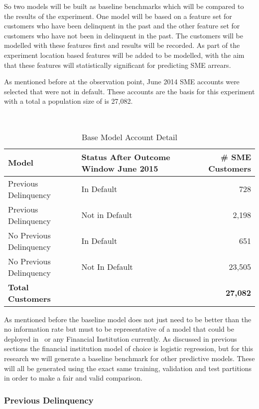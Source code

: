 So two models will be built as baseline benchmarks which will be compared to the results of the experiment. One model will be based on a feature set for customers who have been delinquent in the past and the other feature set for customers who have not been in delinquent in the past. The customers will be modelled with these features first and results will be recorded. As part of the experiment location based features will be added to be modelled, with the aim that these features will statistically significant for predicting SME arrears. 

As mentioned before at the observation point, June 2014 SME accounts were selected that were not in default. These accounts are the basis for this experiment with a total a population size of is 27,082. 


\begin{table}[H]
	\centering\
	\resizebox{\textwidth}{!}
	{
	\begin{tabular}{l| l| r}
		\hline
		\textbf{Model} & \textbf{Status After Outcome Window June 2015} & \textbf{\# SME Customers} \\
		\hline
		Previous Delinquency          & In Default        & 728 \\
		Previous Delinquency          & Not in Default        & 2,198 \\ \hline
		No Previous Delinquency          & In Default        & 651 \\ 
		No Previous Delinquency          & Not In Default        & 23,505 \\
		\hline
		\textbf{Total Customers}         &         & \textbf{27,082} \\ \hline
	\end{tabular}
	}
	\caption{Base Model Account Detail}
\end{table}

As mentioned before the baseline model does not just need to be better than the no information rate but must to be representative of a model that could be deployed in \subjectname\ or any Financial Institution currently. As discussed in previous sections the financial institution model of choice is logistic regression, but for this research we will generate a baseline benchmark for other predictive models. These will all be generated using the exact same training, validation and test partitions in order to make a fair and valid comparison. 

\subsubsection{Previous Delinquency}

